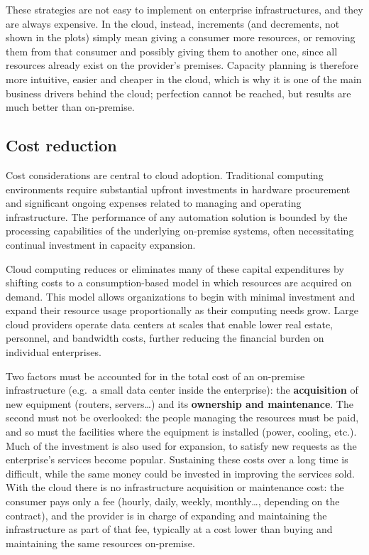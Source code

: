 \documentclass[11pt,a4paper,openany]{report}
\begin{document}
These strategies are not easy to implement on enterprise infrastructures, and they are always expensive. In the cloud, instead, increments (and decrements, not shown in the plots) simply mean giving a consumer more resources, or removing them from that consumer and possibly giving them to another one, since all resources already exist on the provider's premises. Capacity planning is therefore more intuitive, easier and cheaper in the cloud, which is why it is one of the main business drivers behind the cloud; perfection cannot be reached, but results are much better than on-premise.

\subsection{Cost reduction}

Cost considerations are central to cloud adoption. Traditional computing environments require substantial upfront investments in hardware procurement and significant ongoing expenses related to managing and operating infrastructure. The performance of any automation solution is bounded by the processing capabilities of the underlying on-premise systems, often necessitating continual investment in capacity expansion.

Cloud computing reduces or eliminates many of these capital expenditures by shifting costs to a consumption-based model in which resources are acquired on demand. This model allows organizations to begin with minimal investment and expand their resource usage proportionally as their computing needs grow. Large cloud providers operate data centers at scales that enable lower real estate, personnel, and bandwidth costs, further reducing the financial burden on individual enterprises.

Two factors must be accounted for in the total cost of an on-premise infrastructure (e.g.\ a small data center inside the enterprise): the \textbf{acquisition} of new equipment (routers, servers\ldots) and its \textbf{ownership and maintenance}. The second must not be overlooked: the people managing the resources must be paid, and so must the facilities where the equipment is installed (power, cooling, etc.). Much of the investment is also used for expansion, to satisfy new requests as the enterprise's services become popular. Sustaining these costs over a long time is difficult, while the same money could be invested in improving the services sold. With the cloud there is no infrastructure acquisition or maintenance cost: the consumer pays only a fee (hourly, daily, weekly, monthly\ldots, depending on the contract), and the provider is in charge of expanding and maintaining the infrastructure as part of that fee, typically at a cost lower than buying and maintaining the same resources on-premise.
\end{document}
